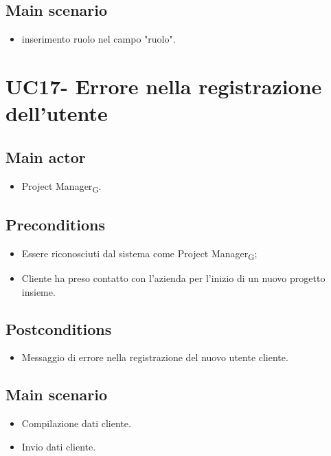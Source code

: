 \documentclass{article}
\begin{document}
    \subsection*{Main scenario}
        \begin{itemize}
            \item inserimento ruolo nel campo "ruolo".
        \end{itemize}

\section{UC17- Errore nella registrazione dell'utente}
\subsection*{Main actor}
        \begin{itemize}
            \item Project Manager\textsubscript{G}.
        \end{itemize}
        
    \subsection*{Preconditions}
        \begin{itemize}
            \item Essere riconosciuti dal sistema come Project Manager\textsubscript{G};
            \item Cliente ha preso contatto con l'azienda per l'inizio di un nuovo progetto insieme.
        \end{itemize}
        
    \subsection*{Postconditions}
        \begin{itemize}
            \item Messaggio di errore nella registrazione del nuovo utente cliente.
        \end{itemize}

    \subsection*{Main scenario}
        \begin{itemize}
            \item Compilazione dati cliente.
            \item Invio dati cliente.
        \end{itemize}
\end{document}
